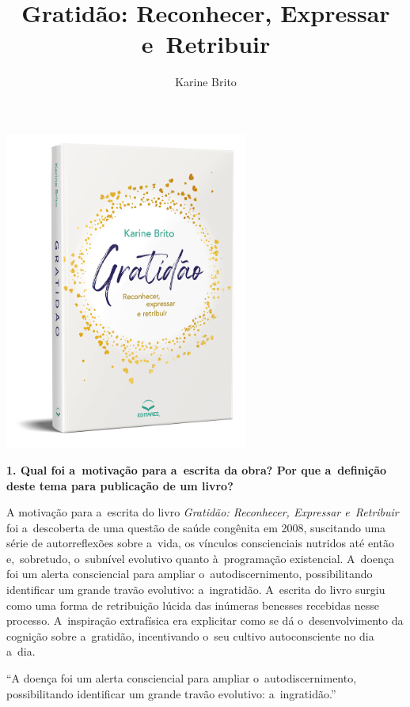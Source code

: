 \documentclass{gescons}
\author{Karine Brito}
\title{Gratidão: Reconhecer, Expressar e~Retribuir}
\begin{document}
    \makeentrevistatitle

    \begin{multicols}{2}

\begin{center}
    \includegraphics[width=8cm]{articles/entrevista/mockups/Karine-Brito.png}
\end{center}

\textbf{1. Qual foi a~motivação para a~escrita da obra? Por que a~definição deste tema para publicação de um livro?}

A motivação para a~escrita do livro \textit{Gratidão: Reconhecer, Expressar e~Retribuir} foi a~descoberta de uma questão de saúde congênita em 2008, suscitando uma série de autorreflexões sobre a~vida, os vínculos conscienciais nutridos até então e,~sobretudo, o~subnível evolutivo quanto à~programação existencial.  A~doença foi um alerta consciencial para ampliar o~autodiscernimento, possibilitando identificar um grande travão evolutivo: a~ingratidão. A~escrita do livro surgiu como uma forma de retribuição lúcida das inúmeras benesses recebidas nesse processo. A~inspiração extrafísica era explicitar como se dá o~desenvolvimento da cognição sobre a~gratidão, incentivando o~seu cultivo autoconsciente no dia a~dia. 

\begin{pullquote}
``A doença foi um alerta consciencial para ampliar o~autodiscernimento, possibilitando identificar um grande travão evolutivo: a~ingratidão.''
\end{pullquote}


\end{multicols}
\end{document}
